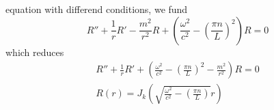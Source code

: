 \documentclass{article} \usepackage{amsmath} \usepackage{amssymb} \usepackage{amsthm} \usepackage[margin=0.2in]{geometry} \usepackage{hyperref} \usepackage{physics} \usepackage{tikz} \usepackage{mathtools} \mathtoolsset{showonlyrefs} \theoremstyle{definition} \newtheorem{theorem}{Theorem}[section] \newtheorem{corollary}{Corollary}[theorem] \newtheorem{lemma}[theorem]{Lemma} \newtheorem{definition}{Definition}[section] \author{Connor Duncan} \date{\today}
\begin{document}
equation with differend conditions, we fund \begin{equation} R''+\frac{1}{r}R'-\frac{m^2}{r^2}R+\left(\frac{\omega^2}{c^2}-\left(\frac{\pi n}{L}\right)^2\right)R=0 \end{equation} which reduces \begin{align} R''+\frac{1}{r}R'+\left(\frac{\omega^2}{c^2}-\left(\frac{\pi n}{L}\right)^2-\frac{m^2}{r^2}\right)R=0 \\ R(r)=J_k(\sqrt{\frac{\omega^2}{c^2}-\left(\frac{\pi n}{L}\right)}r) \end{align}
\end{document}
